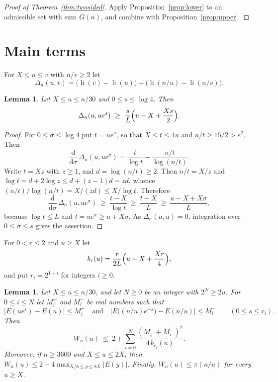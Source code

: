 \documentclass[11pt,reqno]{amsart}
\newtheorem{lemma}[theorem]{Lemma}
\theoremstyle{definition}
\theoremstyle{remark}
\numberwithin{equation}{section}
\newcommand{\dd}{\mathrm{d}}
\DeclareMathOperator{\li}{li}
\begin{document}
\begin{proof}[Proof of Theorem~\ref{thm:twosided}]
Apply Proposition~\ref{prop:lower} to an admissible set with sum $G(n)$, and combine with Proposition~\ref{prop:upper}.
\end{proof}

\section{Main terms}\label{sec:drift}

For $X\le u\le v$ with $n/v\ge2$ let
\[
 \Delta_n(u,v)=\bigl(\li(v)-\li(u)\bigr)-\bigl(\li(n/u)-\li(n/v)\bigr).
\]

\begin{lemma}\label{lem:drift}
Let $X\le u\le n/30$ and $0\le s\le\log4$. Then
\[
 \Delta_n(u,ue^s)\ \ge\ \frac sL\Bigl(u-X+\frac{Xs}{2}\Bigr).
\]
\end{lemma}

\begin{proof}
For $0\le\sigma\le\log4$ put $t=ue^\sigma$, so that $X\le t\le4u$ and $n/t\ge15/2>e^2$. Then
\[
 \frac{\dd}{\dd\sigma}\,\Delta_n(u,ue^{\sigma})=\frac{t}{\log t}-\frac{n/t}{\log(n/t)} .
\]
Write $t=Xz$ with $z\ge1$, and $d=\log(n/t)\ge2$. Then $n/t=X/z$ and $\log t=d+2\log z\le d+(z-1)d=zd$, whence $(n/t)/\log(n/t)=X/(zd)\le X/\log t$. Therefore
\[
 \frac{\dd}{\dd\sigma}\,\Delta_n(u,ue^{\sigma})\ \ge\ \frac{t-X}{\log t}\ \ge\ \frac{t-X}{L}\ \ge\ \frac{u-X+X\sigma}{L},
\]
because $\log t\le L$ and $t=ue^\sigma\ge u+X\sigma$. As $\Delta_n(u,u)=0$, integration over $0\le\sigma\le s$ gives the assertion.
\end{proof}

For $0<r\le2$ and $u\ge X$ let
\[
 b_r(u)=\frac{r}{2L}\Bigl(u-X+\frac{Xr}4\Bigr),
\]
and put $r_i=2^{1-i}$ for integers $i\ge0$.

\begin{lemma}\label{lem:excess}
Let $X\le u\le n/30$, and let $N\ge0$ be an integer with $2^N\ge2u$. For $0\le i\le N$ let $M_i^+$ and $M_i^-$ be real numbers such that
\[
 \bigl|E(ue^{s})-E(u)\bigr|\le M_i^+\quad\text{and}\quad\bigl|E\bigl((n/u)e^{-s}\bigr)-E(n/u)\bigr|\le M_i^-\qquad(0\le s\le r_i).
\]
Then
\[
 W_n(u)\ \le\ 2+\sum_{i=0}^{N}\frac{(M_i^++M_i^-)^2}{4\,b_{r_i}(u)} .
\]
Moreover, if $n\ge3600$ and $X\le u\le2X$, then $W_n(u)\le2+4\max_{X/8\le y\le8X}|E(y)|$. Finally, $W_n(u)\le\pi(n/u)$ for every $u\ge X$.
\end{lemma}
\end{document}
